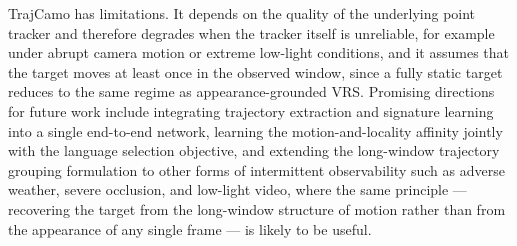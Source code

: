 \documentclass[11pt]{article}
\begin{document}
TrajCamo has limitations.
It depends on the quality of the underlying point tracker and therefore degrades when the tracker itself is unreliable, for example under abrupt camera motion or extreme low-light conditions, and it assumes that the target moves at least once in the observed window, since a fully static target reduces to the same regime as appearance-grounded VRS.
Promising directions for future work include integrating trajectory extraction and signature learning into a single end-to-end network, learning the motion-and-locality affinity jointly with the language selection objective, and extending the long-window trajectory grouping formulation to other forms of intermittent observability such as adverse weather, severe occlusion, and low-light video, where the same principle --- recovering the target from the long-window structure of motion rather than from the appearance of any single frame --- is likely to be useful.
\end{document}
